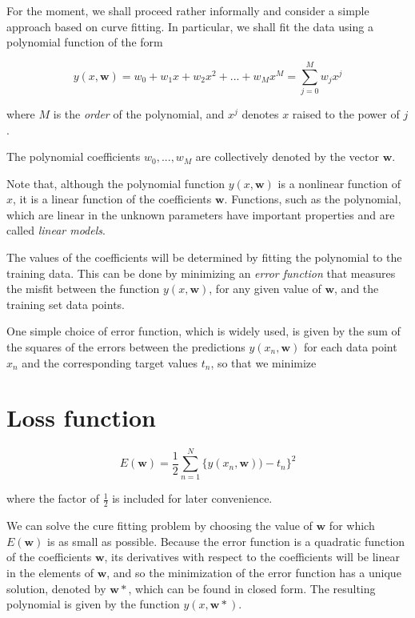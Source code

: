 For the moment, we shall proceed rather informally and consider a simple approach based on curve fitting. In particular, we shall fit the data using a polynomial function of the form

\begin{equation}
    \label{Polynomial}
    y(x, \pmb{w}) = w_0 + w_1x + w_2x^2 + ... + w_Mx^M = \sum_{j=0}^Mw_jx^j
\end{equation}

where $M$ is the \textit{order} of the polynomial, and $x^j$ denotes $x$ raised to the power of $j$.

The polynomial coefficients $w_0, ..., w_M$ are collectively denoted by the vector $\pmb{w}$.

Note that, although the polynomial function $y(x, \pmb{w})$ is a nonlinear function of $x$, it is a linear function of the coefficients $\pmb{w}$. Functions, such as the polynomial, which are linear in the unknown parameters have important properties and are called \textit{linear models}.

The values of the coefficients will be determined by fitting the polynomial to the training data. This can be done by minimizing an \textit{error function} that measures the misfit between the function $y(x, \pmb{w})$, for any given value of $\pmb{w}$, and the training set data points.

One simple choice of error function, which is widely used, is given by the sum of the squares of the errors between the predictions $y(x_n, \pmb{w})$ for each data point $x_n$ and the corresponding target values $t_n$, so that we minimize

\section{Loss function}
\begin{equation}
    \label{Loss function}
    E(\pmb{w}) = \frac{1}{2} \sum_{n=1}^N \{y(x_n, \pmb{w})) - t_n \}^2
\end{equation}

where the factor of $\frac{1}{2}$ is included for later convenience.

We can solve the cure fitting problem by choosing the value of $\pmb{w}$ for which $E(\pmb{w})$ is as small as possible. Because the error function is a quadratic function of the coefficients $\pmb{w}$, its derivatives with respect to the coefficients will be linear in the elements of $\pmb{w}$, and so the minimization of the error function has a unique solution, denoted by $\pmb{w}*$, which can be found in closed form. The resulting polynomial is given by the function $y(x, \pmb{w}*)$.

